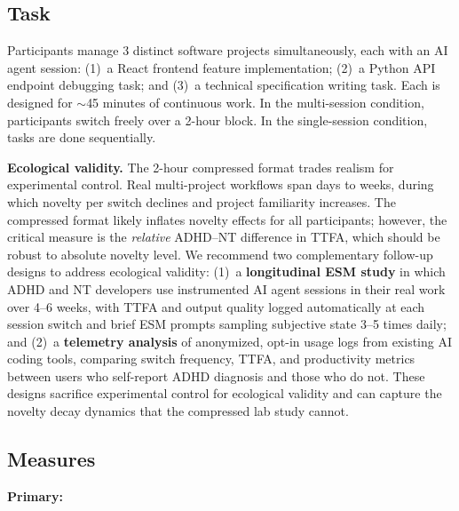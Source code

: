 \documentclass[sigconf,nonacm]{acmart}
\begin{document}
\subsection{Task}

Participants manage 3 distinct software projects simultaneously, each with an AI agent session: (1)~a React frontend feature implementation; (2)~a Python API endpoint debugging task; and (3)~a technical specification writing task. Each is designed for $\sim$45 minutes of continuous work. In the multi-session condition, participants switch freely over a 2-hour block. In the single-session condition, tasks are done sequentially.

\textbf{Ecological validity.} The 2-hour compressed format trades realism for experimental control. Real multi-project workflows span days to weeks, during which novelty per switch declines and project familiarity increases. The compressed format likely inflates novelty effects for all participants; however, the critical measure is the \emph{relative} ADHD--NT difference in TTFA, which should be robust to absolute novelty level. We recommend two complementary follow-up designs to address ecological validity: (1)~a \textbf{longitudinal ESM study} in which ADHD and NT developers use instrumented AI agent sessions in their real work over 4--6 weeks, with TTFA and output quality logged automatically at each session switch and brief ESM prompts sampling subjective state 3--5 times daily; and (2)~a \textbf{telemetry analysis} of anonymized, opt-in usage logs from existing AI coding tools, comparing switch frequency, TTFA, and productivity metrics between users who self-report ADHD diagnosis and those who do not. These designs sacrifice experimental control for ecological validity and can capture the novelty decay dynamics that the compressed lab study cannot.

\subsection{Measures}

\textbf{Primary:}
\end{document}
